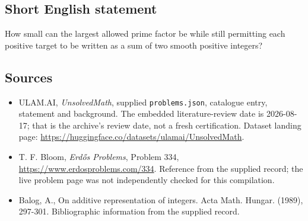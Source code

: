 \documentclass[11pt,a4paper]{article}
\begin{document}
\subsection{Short English statement}

How small can the largest allowed prime factor be while still permitting each positive target to be written as a sum of two smooth positive integers?

\subsection{Sources}

{\small

\begin{itemize}

\item[\hypertarget{source:statement:1}{S1}] ULAM.AI, \emph{UnsolvedMath}, supplied \texttt{problems.json}, catalogue entry, statement and background. The embedded literature-review date is 2026-08-17; that is the archive’s review date, not a fresh certification. Dataset landing page: \url{https://huggingface.co/datasets/ulamai/UnsolvedMath}.

\item[\hypertarget{source:statement:2}{S2}] T. F. Bloom, \emph{Erdős Problems}, Problem 334, \url{https://www.erdosproblems.com/334}. Reference from the supplied record; the live problem page was not independently checked for this compilation.

\item[\hypertarget{source:statement:3}{S3}] Balog, A., On additive representation of integers. Acta Math. Hungar. (1989), 297-301. Bibliographic information from the supplied record.

\end{itemize}

}

\label{end:statement}
\end{document}

